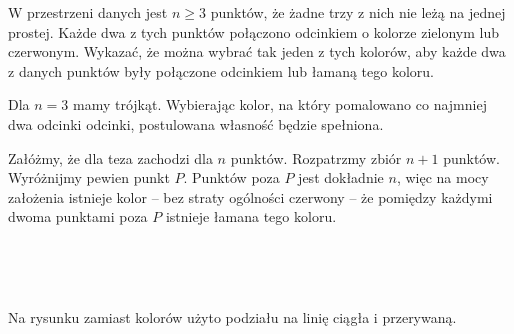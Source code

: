 \begin{problem}{4}
	W przestrzeni danych jest $n \geqslant 3$ punktów, że żadne trzy z nich nie leżą na jednej prostej. Każde dwa z tych punktów połączono odcinkiem o kolorze zielonym lub czerwonym. Wykazać, że można wybrać tak jeden z tych kolorów, aby każde dwa z danych punktów były połączone odcinkiem lub łamaną tego koloru.
\end{problem}

\noindent
Dla $n = 3$ mamy trójkąt. Wybierając kolor, na który pomalowano co najmniej dwa odcinki odcinki, postulowana własność będzie spełniona.
\vspace{10px}

\noindent
Załóżmy, że dla teza zachodzi dla $n$ punktów. Rozpatrzmy zbiór $n + 1$ punktów. Wyróżnijmy pewien punkt $P$. Punktów poza $P$ jest dokładnie $n$, więc na mocy założenia istnieje kolor -- bez straty ogólności czerwony -- że pomiędzy każdymi dwoma punktami poza $P$ istnieje łamana tego koloru. 

\begin{minipage}{0.5\textwidth}
\begin{center}
\\

\end{center}
\end{minipage}
\begin{minipage}{0.5\textwidth}
\begin{center}
\\
\end{center}
\end{minipage}
\begin{center}
Na rysunku zamiast kolorów użyto podziału na linię ciągła i przerywaną.
\end{center}

